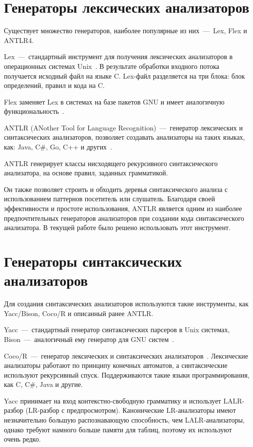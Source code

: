 \section{Генераторы лексических анализаторов}

Существует множество генераторов, наиболее популярные из них~---~Lex, Flex и ANTLR4.

Lex~---~стандартный инструмент для получения лексических анализаторов в операционных системах Unix~\cite{lesk1975lex}. 
В результате обработки входного потока получается исходный файл на языке C. 
Lex-файл разделяется на три блока: блок определений, правил и кода на C. 

Flex заменяет Lex в системах на базе пакетов GNU и имеет аналогичную функциональность~\cite{sampath2007test}.

ANTLR (ANother Tool for Language Recognition)~---~генератор лексических и синтаксических анализаторов, позволяет создавать анализаторы на таких языках, как: Java, C\#, Go, C++ и других~\cite{parr2004s}.

ANTLR генерирует классы нисходящего рекурсивного синтаксического анализатора, на основе правил, заданных грамматикой. 

Он также позволяет строить и обходить деревья синтаксического анализа с использованием паттернов посетитель или слушатель. 
Благодаря своей эффективности и простоте использования, ANTLR является одним из наиболее предпочтительных генераторов анализаторов при создании кода синтаксического анализатора. 
В текущей работе было решено использовать этот инструмент.

\section{Генераторы синтаксических анализаторов}

Для создания синтаксических анализаторов используются такие инструменты, как Yacc/Bison, Coco/R и описанный ранее ANTLR.

Yacc~---~стандартный генератор синтаксических парсеров в Unix системах, Bison~---~аналогичный ему генератор для GNU систем~\cite{yacc}.

Coco/R~---~генератор лексических и синтаксических анализаторов~\cite{mossenbock2003compilergenerator}. 
Лексические анализаторы работают по принципу конечных автоматов, а синтаксические используют рекурсивный спуск. 
Поддерживаются такие языки программирования, как C\+\+, C\#, Java и другие.

Yacc принимает на вход контекстно-свободную грамматику и использует LALR-разбор (LR-разбор с предпросмотром). 
Канонические LR-анализаторы имеют незначительно большую распознавающую способность, чем LALR-анализаторы, однако требуют намного больше памяти для таблиц, поэтому их используют очень редко.

